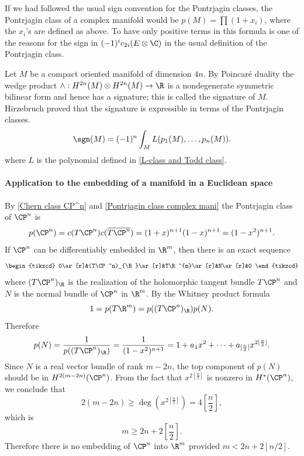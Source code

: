 \begin{remark}
If we had followed the usual sign convention for the Pontrjagin classes, the Pontrjagin class of a complex manifold would be $p(M)=\prod(1+x_i)$, where the $x_i$'s are 
defined as above. To have only positive terms in this formula is one of the reasons for the sign in $(-1)^ic_{2i}(E\otimes\C)$ in the usual definition of the Pontrjagin 
class.
\end{remark}
\begin{remark}
Let $M$ be a compact oriented manifold of dimension $4n$. By Poincar\'e duality the wedge product $\wedge:H^{2n}(M)\otimes H^{2n}(M)\to\R$ is a nondegenerate symmetric 
bilinear form and hence has a signature; this is called the signature of $M$. Hirzebruch proved that the signature is expressible in terms of the Pontrjagin classes.
\[\sgn(M)=(-1)^n\int_ML(p_1(M),\dots,p_n(M)).\]
where $L$ is the polynomial defined in \cref{L-class and Todd class}.
\end{remark}
\paragraph{Application to the embedding of a manifold in a Euclidean space}
\begin{example}
By \cref{Chern class CP^n} and \cref{Pontrjagin class complex mani} the Pontrjagin class of $\CP^n$ is
\[p(\CP^n)=c(T\CP^n)c(\overline{T\CP^n})=(1+x)^{n+1}(1-x)^{n+1}=(1-x^2)^{n+1}.\]
If $\CP^n$ can be differentiably embedded in $\R^m$, then there is an exact sequence
\[\begin{tikzcd}
0\ar[r]&(T\CP^n)_{\R}\ar[r]&T\R^{m}\ar[r]&N\ar[r]&0
\end{tikzcd}\]
where $(T\CP^n)_{\R}$ is the realization of the holomorphic tangent bundle $T\CP^n$ and $N$ is the normal bundle of $\CP^n$ in $\R^m$. By the Whitney product formula
\[1=p(T\R^m)=p((T\CP^n)_{\R})p(N).\]
Therefore
\[p(N)=\frac{1}{p((T\CP^n)_{\R})}=\frac{1}{(1-x^2)^{n+1}}=1+a_1x^2+\cdots+a_{[\frac{n}{2}]}x^{2[\frac{n}{2}]}.\]
Since $N$ is a real vector bundle of rank $m-2n$, the top component of $p(N)$ should be in $H^{2(m-2n)}(\CP^n)$. From the fact that $x^{2[\frac{n}{2}]}$ is nonzero 
in $H^*(\CP^n)$, we conclude that
\[2(m-2n)\geq\deg(x^{2[\frac{n}{2}]})=4[\frac{n}{2}],\]
which is
\[m\geq 2n+2[\frac{n}{2}].\]
Therefore there is no embedding of $\CP^n$ into $\R^m$ provided $m<2n+2[n/2]$.
\end{example}
